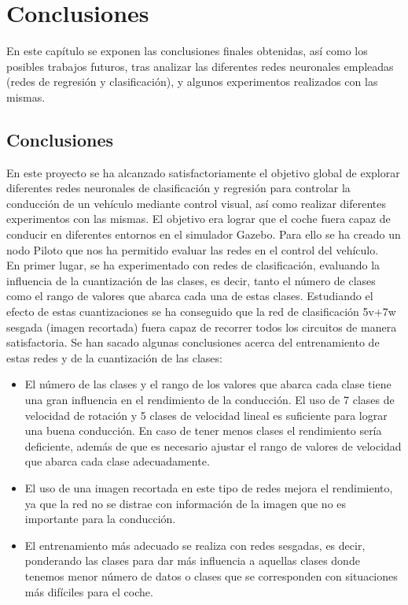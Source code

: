 \chapter{Conclusiones}\label{cap.conclusiones}

En este capítulo se exponen las conclusiones finales obtenidas, así como los posibles trabajos futuros, tras analizar las diferentes redes neuronales empleadas (redes de regresión y clasificación), y algunos experimentos realizados con las mismas.

\section{Conclusiones}

En este proyecto se ha alcanzado satisfactoriamente el objetivo global de explorar diferentes redes neuronales de clasificación y regresión para controlar la conducción de un vehículo mediante control visual, así como realizar diferentes experimentos con las mismas. El objetivo era lograr que el coche fuera capaz de conducir en diferentes entornos en el simulador Gazebo. Para ello se ha creado un nodo Piloto que nos ha permitido evaluar las redes en el control del vehículo.\\

En primer lugar, se ha experimentado con redes de clasificación, evaluando la influencia de la cuantización de las clases, es decir, tanto el número de clases como el rango de valores que abarca cada una de estas clases. Estudiando el efecto de estas cuantizaciones se ha conseguido que la red de clasificación 5v+7w sesgada (imagen recortada) fuera capaz de recorrer todos los circuitos de manera satisfactoria. Se han sacado algunas conclusiones acerca del entrenamiento de estas redes y de la cuantización de las clases:\\

\begin{itemize}
    \item El número de las clases y el rango de los valores que abarca cada clase tiene una gran influencia en el rendimiento de la conducción. El uso de 7 clases de velocidad de rotación y 5 clases de velocidad lineal es suficiente para lograr una buena conducción. En caso de tener menos clases el rendimiento sería deficiente, además de que es necesario ajustar el rango de valores de velocidad que abarca cada clase adecuadamente.
    
    \item El uso de una imagen recortada en este tipo de redes mejora el rendimiento, ya que la red no se distrae con información de la imagen que no es importante para la conducción.
    
    \item El entrenamiento más adecuado se realiza con redes sesgadas, es decir, ponderando las clases para dar más influencia a aquellas clases donde tenemos menor número de datos o clases que se corresponden con situaciones más difíciles para el coche.
\end{itemize}

